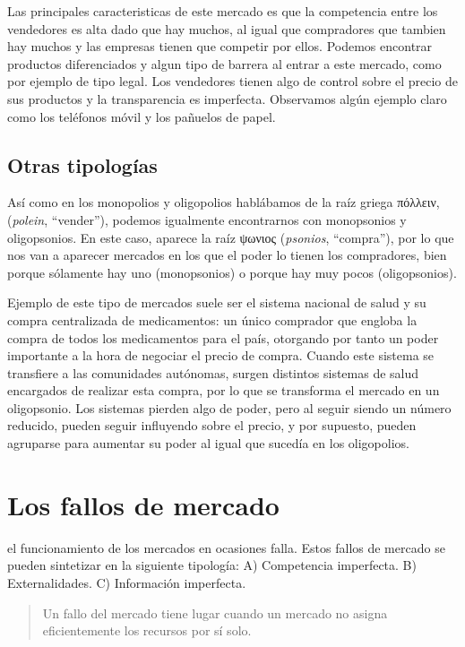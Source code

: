 \documentclass[
]{krantz}
\begin{document}
Las principales caracteristicas de este mercado es que la competencia entre los vendedores es alta dado que hay muchos, al igual que compradores que tambien hay muchos y las empresas tienen que competir por ellos. Podemos encontrar productos diferenciados y algun tipo de barrera al entrar a este mercado, como por ejemplo de tipo legal. Los vendedores tienen algo de control sobre el precio de sus productos y la transparencia es imperfecta.
Observamos algún ejemplo claro como los teléfonos móvil y los pañuelos de papel.

\hypertarget{otras-tipologuxedas}{%
\section{Otras tipologías}\label{otras-tipologuxedas}}

Así como en los monopolios y oligopolios hablábamos de la raíz griega πόλλειν, (\emph{polein}, ``vender''), podemos igualmente encontrarnos con monopsonios y oligopsonios. En este caso, aparece la raíz ψωνιος (\emph{psonios}, ``compra''), por lo que nos van a aparecer mercados en los que el poder lo tienen los compradores, bien porque sólamente hay uno (monopsonios) o porque hay muy pocos (oligopsonios).

Ejemplo de este tipo de mercados suele ser el sistema nacional de salud y su compra centralizada de medicamentos: un único comprador que engloba la compra de todos los medicamentos para el país, otorgando por tanto un poder importante a la hora de negociar el precio de compra. Cuando este sistema se transfiere a las comunidades autónomas, surgen distintos sistemas de salud encargados de realizar esta compra, por lo que se transforma el mercado en un oligopsonio. Los sistemas pierden algo de poder, pero al seguir siendo un número reducido, pueden seguir influyendo sobre el precio, y por supuesto, pueden agruparse para aumentar su poder al igual que sucedía en los oligopolios.

\hypertarget{los-fallos-de-mercado}{%
\chapter{Los fallos de mercado}\label{los-fallos-de-mercado}}

el funcionamiento de los mercados en ocasiones falla. Estos fallos de mercado se pueden sintetizar en la siguiente tipología:
A) Competencia imperfecta.
B) Externalidades.
C) Información imperfecta.

\begin{quote}
Un fallo del mercado tiene lugar cuando un mercado no asigna eficientemente los recursos por sí solo.
\end{quote}
\end{document}
